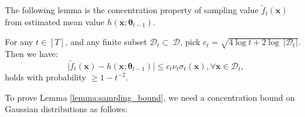 
The following lemma is the concentration property of sampling value $\widetilde{f}_t(\mathbf{x})$ from estimated mean value $h(\mathbf{x}; \boldsymbol{\theta}_{t-1})$.
\begin{lemma}
\label{lemma:sampling_bound}
For any $t \in [T]$, and any finite subset $\mathcal{D}_t \subset\ \mathcal{D}$,  pick $c_t =  \sqrt{4\log t + 2 \log \ \lvert \mathcal D_t \rvert}$. Then we have:  
\[\lvert \widetilde{f}_t(\mathbf{x}) - h(\mathbf{x}; \boldsymbol{\theta}_{t-1}) \rvert \leq c_t\nu_t \sigma_t(\mathbf{x}), \forall \mathbf{x} \in \mathcal{D}_t, \] 
holds with probability $\geq  1-t^{-2}$.
\end{lemma}

To prove Lemma \ref{lemma:sampling_bound}, we need a concentration bound on Gaussian distributions \citep{hoffman2013exploiting} as follows: 

